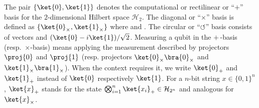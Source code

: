 \documentclass[final,11pt,a4paper]{report}
\newcommand*{\assign}{\ensuremath{\kern.5ex\raisebox{.1ex}{\mbox{\rm:}}\kern -.3em =}}
\newcommand*{\cH}{\mathcal{H}}
\newcommand*{\nbit}{\set{0,1}^n}
\newcommand*{\set}[1]{\{#1\}}          %
\newcommand*{\dens}[1]{\mathcal{P}(#1)}  %
\newcommand*{\regE}{E}
\newcommand*{\rs}{\regE}
\begin{document}
The pair $\{\ket{0},\ket{1}\}$ denotes the computational or
rectilinear or ``$+$'' basis for the $2$-dimensional Hilbert space
${\mathcal H}_2$.  The diagonal or ``$\times$'' basis is defined as
$\{\ket{0}_\times,\ket{1}_{\times}\}$ where
 and
. The circular or
``$\circlearrowleft$'' basis consists of vectors  and \mbox{$(\ket{0} - i \ket{1})/\sqrt2$}.
Measuring a qubit in the $+\,$-basis (resp.\ $\times$-basis) means
applying the measurement described by projectors $\proj{0}$ and
$\proj{1}$ (resp.  projectors $\ket{0}_\times \bra{0}_\times$ and
$\ket{1}_{\times}\bra{1}_\times$).  When the context requires it, we
write $\ket{0}_+$ and $\ket{1}_+$ instead of $\ket{0}$ respectively
$\ket{1}$. For a $n$-bit string $x \in \nbit$, $\ket{x}_+$ stands for
the state $\bigotimes_{i=1}^n \ket{x_i}_+ \in \cH_{2^n}$ and analogous for
  $\ket{x}_{\times}$.



\end{document}
